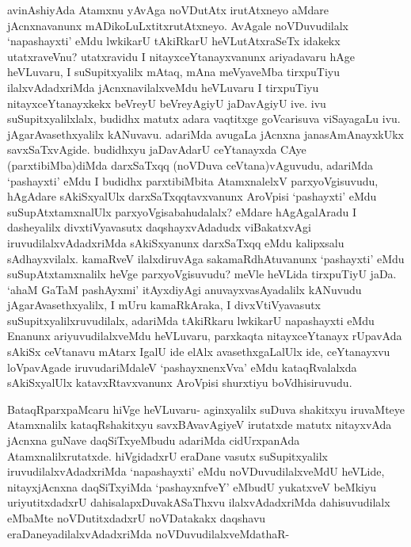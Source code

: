 \begin{artha}
avinAshiyAda Atamxnu yAvAga noVDutAtx irutAtxneyo aMdare jAcnxnavanunx mADikoLuLxtitxrutAtxneyo. AvAgale noVDuvudilalx `napashayxti' eMdu lwkikarU tAkiRkarU heVLutAtxraSeTx idakekx utatxraveVnu? utatxravidu I nitayxceYtanayxvanunx ariyadavaru hAge heVLuvaru, I suSupitxyalilx mAtaq, mAna meVyaveMba tirxpuTiyu ilalxvAdadxriMda jAcnxnavilalxveMdu heVLuvaru I tirxpuTiyu nitayxceYtanayxkekx beVreyU beVreyAgiyU jaDavAgiyU ive. ivu suSupitxyalilxlalx, budidhx matutx adara vaqtitxge goVcarisuva viSayagaLu ivu. jAgarAvasethxyalilx kANuvavu. adariMda avugaLa jAcnxna janasAmAnayxkUkx savxSaTxvAgide. budidhxyu jaDavAdarU ceYtanayxda CAye (parxtibiMba)diMda darxSaTxqq (noVDuva ceVtana)vAguvudu, adariMda `pashayxti' eMdu I budidhx parxtibiMbita AtamxnalelxV parxyoVgisuvudu, hAgAdare sAkiSxyalUlx darxSaTxqqtavxvanunx AroVpisi `pashayxti' eMdu suSupAtxtamxnalUlx parxyoVgisabahudalalx? eMdare hAgAgalAradu I dasheyalilx divxtiVyavasutx daqshayxvAdadudx viBakatxvAgi iruvudilalxvAdadxriMda sAkiSxyanunx darxSaTxqq eMdu kalipxsalu sAdhayxvilalx. kamaRveV ilalxdiruvAga sakamaRdhAtuvanunx `pashayxti' eMdu suSupAtxtamxnalilx heVge parxyoVgisuvudu? meVle heVLida tirxpuTiyU jaDa. `ahaM GaTaM pashAyxmi' itAyxdiyAgi anuvayxvasAyadalilx kANuvudu jAgarAvasethxyalilx, I mUru kamaRkAraka, I divxVtiVyavasutx suSupitxyalilxruvudilalx, adariMda tAkiRkaru lwkikarU napashayxti eMdu Enanunx ariyuvudilalxveMdu heVLuvaru, parxkaqta nitayxceYtanayx rUpavAda sAkiSx ceVtanavu mAtarx IgalU ide elAlx avasethxgaLalUlx ide, ceYtanayxvu loVpavAgade iruvudariMdaleV `pashayxnenxVva' eMdu kataqRvalalxda sAkiSxyalUlx katavxRtavxvanunx AroVpisi shurxtiyu boVdhisiruvudu. 
\end{artha}%


\begin{artha}
BataqRparxpaMcaru hiVge heVLuvaru- aginxyalilx suDuva shakitxyu iruvaMteye Atamxnalilx kataqRshakitxyu savxBAvavAgiyeV irutatxde matutx nitayxvAda jAcnxna guNave daqSiTxyeMbudu adariMda cidUrxpanAda Atamxnalilxrutatxde. hiVgidadxrU eraDane vasutx suSupitxyalilx iruvudilalxvAdadxriMda `napashayxti' eMdu noVDuvudilalxveMdU heVLide, nitayxjAcnxna daqSiTxyiMda `pashayxnfveY' eMbudU yukatxveV beMkiyu uriyutitxdadxrU dahisalapxDuvakASaThxvu ilalxvAdadxriMda dahisuvudilalx eMbaMte noVDutitxdadxrU noVDatakakx daqshavu eraDaneyadilalxvAdadxriMda noVDuvudilalxveMdathaR-
\end{artha}


